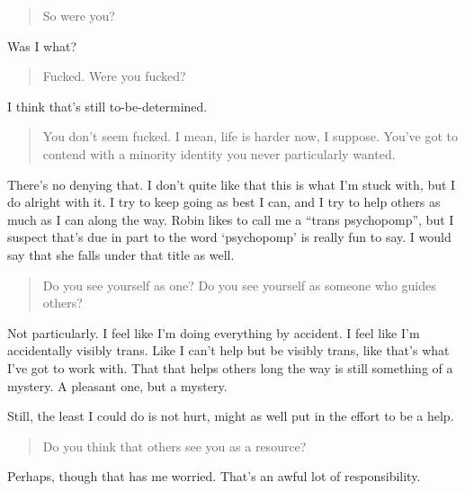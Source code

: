 \begin{quote}
So were you?
\end{quote}

Was I what?

\begin{quote}
Fucked. Were you fucked?
\end{quote}

I think that's still to-be-determined.

\begin{quote}
You don't seem fucked. I mean, life is harder now, I suppose. You've got to contend with a minority identity you never particularly wanted.
\end{quote}

There's no denying that. I don't quite like that this is what I'm stuck with, but I do alright with it. I try to keep going as best I can, and I try to help others as much as I can along the way. Robin likes to call me a ``trans psychopomp'', but I suspect that's due in part to the word `psychopomp' is really fun to say. I would say that she falls under that title as well.

\begin{quote}
Do you see yourself as one? Do you see yourself as someone who guides others?
\end{quote}

Not particularly. I feel like I'm doing everything by accident. I feel like I'm accidentally visibly trans. Like I can't help but be visibly trans, like that's what I've got to work with. That that helps others long the way is still something of a mystery. A pleasant one, but a mystery.

Still, the least I could do is not hurt, might as well put in the effort to be a help.

\begin{quote}
Do you think that others see you as a resource?
\end{quote}

Perhaps, though that has me worried. That's an awful lot of responsibility.
